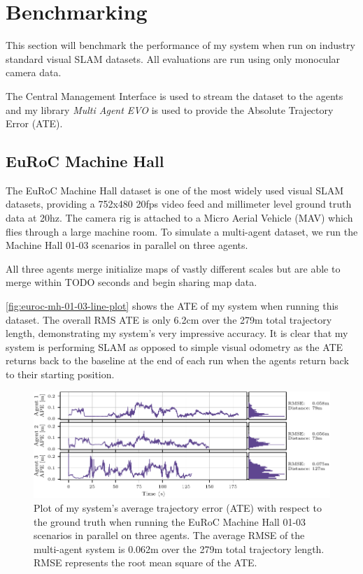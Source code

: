 \section{Benchmarking}
\label{sec:benchmarking}
This section will benchmark the performance of my system when run on industry standard visual SLAM datasets. All evaluations are run using only monocular camera data.

The Central Management Interface is used to stream the dataset to the agents and my library \textit{Multi Agent EVO} is used to provide the Absolute Trajectory Error (ATE).

\subsection{EuRoC Machine Hall}
\label{sec:euroc-machine-hall}
The EuRoC Machine Hall dataset \autocite{burri2016euroc} is one of the most widely used visual SLAM datasets, providing a 752x480 20fps video feed and millimeter level ground truth data at 20hz. The camera rig is attached to a Micro Aerial Vehicle (MAV) which flies through a large machine room. To simulate a multi-agent dataset, we run the Machine Hall 01-03 scenarios in parallel on three agents.

All three agents merge initialize maps of vastly different scales but are able to merge within TODO seconds and begin sharing map data.

\autoref{fig:euroc-mh-01-03-line-plot} shows the ATE of my system when running this dataset. The overall RMS ATE is only 6.2cm over the 279m total trajectory length, demonstrating my system's very impressive accuracy. It is clear that my system is performing SLAM as opposed to simple visual odometry as the ATE returns back to the baseline at the end of each run when the agents return back to their starting position.

\begin{figure}[h]
    \centering
    \includegraphics[width=\linewidth]{figures/EuRoC_MH_01-03_line_plot.pdf}

    \caption{Plot of my system's average trajectory error (ATE) with respect to the ground truth when running the EuRoC Machine Hall 01-03 scenarios in parallel on three agents. The average RMSE of the multi-agent system is 0.062m over the 279m total trajectory length. \captionbreak RMSE represents the root mean square of the ATE.}
    \label{fig:euroc-mh-01-03-line-plot}
\end{figure}

